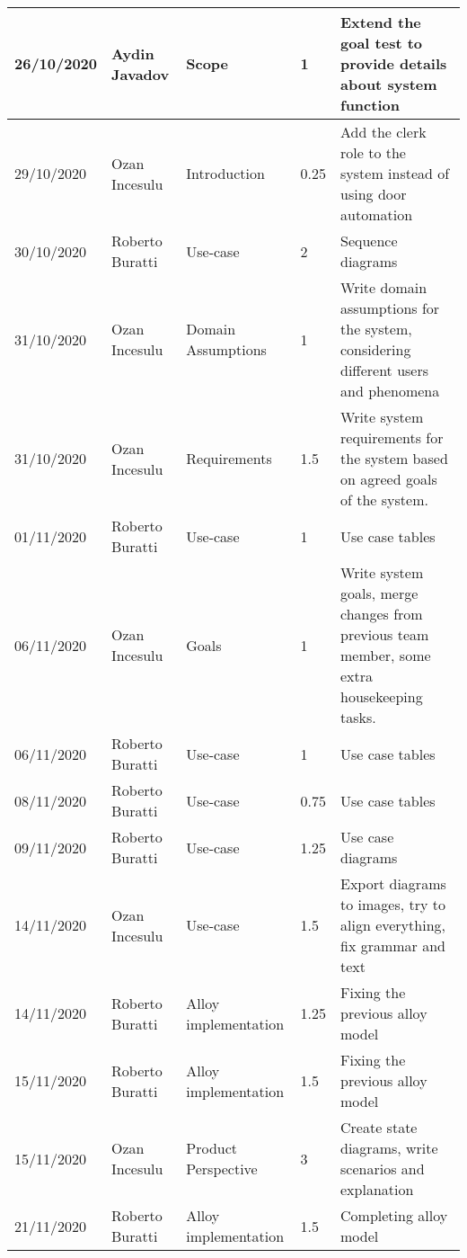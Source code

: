 \begin{table}[h]
\begin{tabular}{|p{2cm}|p{2cm}|p{2cm}|p{1.5cm}|p{8cm}|}
        26/10/2020 & Aydin Javadov   & Scope                & 1                & Extend the goal test to provide details about system function\\ \hline
        29/10/2020 & Ozan Incesulu   & Introduction         & 0.25             & Add the clerk role to the system instead of using door automation \\ \hline
        30/10/2020 & Roberto Buratti & Use-case             & 2                & Sequence diagrams \\ \hline
        31/10/2020 & Ozan Incesulu   & Domain Assumptions   & 1                & Write domain assumptions for the system, considering different users and phenomena \\ \hline
        31/10/2020 & Ozan Incesulu   & Requirements         & 1.5              & Write system requirements for the system based on agreed goals of the system. \\ \hline
        01/11/2020 & Roberto Buratti & Use-case             & 1                & Use case tables \\ \hline
        06/11/2020 & Ozan Incesulu   & Goals                & 1                & Write system goals, merge changes from previous team member, some extra housekeeping tasks. \\ \hline
        06/11/2020 & Roberto Buratti & Use-case             & 1                & Use case tables \\ \hline
        08/11/2020 & Roberto Buratti & Use-case             & 0.75             & Use case tables \\ \hline
        09/11/2020 & Roberto Buratti & Use-case             & 1.25             & Use case diagrams \\ \hline
        14/11/2020 & Ozan Incesulu   & Use-case             & 1.5              & Export diagrams to images, try to align everything, fix grammar and text \\ \hline
        14/11/2020 & Roberto Buratti & Alloy implementation & 1.25             & Fixing the previous alloy model \\ \hline
        15/11/2020 & Roberto Buratti & Alloy implementation & 1.5              & Fixing the previous alloy model \\ \hline
        15/11/2020 & Ozan Incesulu   & Product Perspective  & 3                & Create state diagrams, write scenarios and explanation \\ \hline
        21/11/2020 & Roberto Buratti & Alloy implementation & 1.5              & Completing alloy model \\ \hline

\end{tabular}
\end{table}
